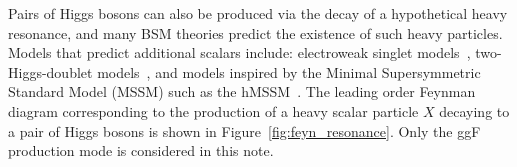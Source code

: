 \documentclass[twoside,11pt]{report}
\begin{document}
Pairs of Higgs bosons can also be produced via the decay of a hypothetical heavy resonance, and many BSM theories predict the existence of such heavy particles. Models that predict additional scalars include: electroweak singlet models~\cite{Hill:1987ea, Robens:2015gla}, two-Higgs-doublet models~\cite{THDM}, and models inspired by the Minimal Supersymmetric Standard Model (MSSM) such as the hMSSM~\cite{ Djouadi:2005gj, Djouadi:2013vqa, Djouadi:2013uqa, Djouadi:2015jea}. The leading order Feynman diagram corresponding to the production of a heavy scalar particle $X$ decaying to a pair of Higgs bosons is shown in Figure~\ref{fig:feyn_resonance}. Only the ggF production mode is considered in this note.




\end{document}
